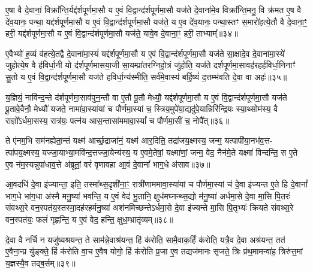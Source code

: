 ए॒षा वै दे॒वानां॒ विक्रा᳚न्ति॒र्यद्द॑र्\mbox{}शपूर्णमा॒सौ य ए॒वं वि॒द्वान्द॑र्\mbox{}शपूर्णमा॒सौ यज॑ते दे॒वाना॑मे॒व विक्रा᳚न्ति॒मनु॒ वि क्र॑मत ए॒ष वै दे॑व॒यानः॒ पन्था॒ यद्द॑र्\mbox{}शपूर्णमा॒सौ य ए॒वं वि॒द्वान्द॑र्\mbox{}शपूर्णमा॒सौ यज॑ते॒ य ए॒व दे॑व॒यानः॒ पन्था॒स्तꣳ स॒मारो॑हत्ये॒तौ वै दे॒वाना॒ꣳ॒ हरी॒ यद्द॑र्\mbox{}शपूर्णमा॒सौ य ए॒वं वि॒द्वान्द॑र्\mbox{}शपूर्णमा॒सौ यज॑ते॒ यावे॒व दे॒वाना॒ꣳ॒ हरी॒ ताभ्याम्᳚॥३४॥

ए॒वैभ्यो॑ ह॒व्यं व॑हत्ये॒तद्वै दे॒वाना॑मा॒स्यं॑ यद्द॑र्\mbox{}शपूर्णमा॒सौ य ए॒वं वि॒द्वान्द॑र्\mbox{}शपूर्णमा॒सौ यज॑ते सा॒क्षादे॒व दे॒वाना॑मा॒स्ये॑ जुहोत्ये॒ष वै ह॑विर्धा॒नी यो द॑र्\mbox{}शपूर्णमासया॒जी सा॒यम्प्रा॑तरग्निहो॒त्रं जु॑होति॒ यज॑ते दर्\mbox{}शपूर्णमा॒सावह॑रहर्\mbox{}हविर्धा॒निनाꣳ॑ सु॒तो य ए॒वं वि॒द्वान्द॑र्\mbox{}शपूर्णमा॒सौ यज॑ते हविर्धा॒न्य॑स्मीति॒ सर्व॑मे॒वास्य॑ बर्\mbox{}हि॒ष्यं॑ द॒त्तम्भ॑वति दे॒वा वा अहः॑॥३५॥

य॒ज्ञियं॒ नावि॑न्द॒न्ते द॑र्\mbox{}शपूर्णमा॒साव॑पुन॒न्तौ वा ए॒तौ पू॒तौ मेध्यौ॒ यद्द॑र्\mbox{}शपूर्णमा॒सौ य ए॒वं वि॒द्वान्द॑र्\mbox{}शपूर्णमा॒सौ यज॑ते पू॒तावे॒वैनौ॒ मेध्यौ॑ यजते॒ नामा॑वा॒स्या॑यां च पौर्णमा॒स्यां च॒ स्त्रिय॒मुपे॑या॒द्यदु॑पे॒यान्निरि॑न्द्रियः स्या॒थ्सोम॑स्य॒ वै राज्ञो᳚\-ऽर्धमा॒सस्य॒ रात्र॑यः॒ पत्न॑य आस॒न्तासा॑ममावा॒स्यां᳚ च पौर्णमा॒सीं च॒ नोपै᳚त्॥३६॥

ते ए॑नम॒भि सम॑नह्येता॒न्तं यक्ष्म॑ आर्च्छ॒द्राजा॑नं॒ यक्ष्म॑ आर॒दिति॒ तद्रा॑जय॒क्ष्मस्य॒ जन्म॒ यत्पापी॑या॒नभ॑व॒त्त- त्पा॑पय॒क्ष्मस्य॒ यज्जा॒याभ्या॒मवि॑न्द॒त्तज्जा॒येन्य॑स्य॒ य ए॒वमे॒तेषां॒ यक्ष्मा॑णां॒ जन्म॒ वेद॒ नैन॑मे॒ते यक्ष्मा॑ विन्दन्ति॒ स ए॒ते ए॒व न॑म॒स्यन्नुपा॑धाव॒त्ते अ॑ब्रूतां॒ वरं॑ वृणावहा आ॒वं दे॒वानां᳚ भाग॒धे अ॑साव॥३७॥

आ॒वदधि॑ दे॒वा इ॑ज्यान्ता॒ इति॒ तस्मा᳚थ्स॒दृशी॑ना॒ꣳ॒ रात्री॑णाममावा॒स्या॑यां च पौर्णमा॒स्यां च॑ दे॒वा इ॑ज्यन्त ए॒ते हि दे॒वानां᳚ भाग॒धे भा॑ग॒धा अ॑स्मै मनु॒ष्या॑ भवन्ति॒ य ए॒वं वेद॑ भू॒तानि॒ क्षुध॑मघ्नन्थ्स॒द्यो म॑नु॒ष्या॑ अर्धमा॒से दे॒वा मा॒सि पि॒तरः॑ संवथ्स॒रे वन॒स्पत॑य॒स्तस्मा॒दह॑रहर्मनु॒ष्या॑ अश॑नमिच्छन्ते\-ऽर्धमा॒से दे॒वा इ॑ज्यन्ते मा॒सि पि॒तृभ्यः॑ क्रियते संवथ्स॒रे वन॒स्पत॑यः॒ फलं॑ गृह्णन्ति॒ य ए॒वं वेद॒ हन्ति॒ क्षुध॒म्भ्रातृ॑व्यम्॥३८॥

{\anuvakamend[{प॒श्य॒ति॒ ताभ्या॒मह॑रैदसाव॒ फलꣳ॑ स॒प्त च॑॥६॥}]}

दे॒वा वै नर्चि न यजु॑ष्यश्रयन्त॒ ते साम॑न्ने॒वाश्र॑यन्त॒ हिं क॑रोति॒ सामै॒वाक॒र्\mbox{}हिं क॑रोति॒ यत्रै॒व दे॒वा अश्र॑यन्त॒ तत॑ ए॒वैना॒न्प्र यु॑ङ्क्ते॒ हिं क॑रोति वा॒च ए॒वैष योगो॒ हिं क॑रोति प्र॒जा ए॒व तद्यज॑मानः सृजते॒ त्रिः प्र॑थ॒मामन्वा॑ह॒ त्रिरु॑त्त॒मां य॒ज्ञस्यै॒व तद्ब॒र्\mbox{}सम्॥३९॥

